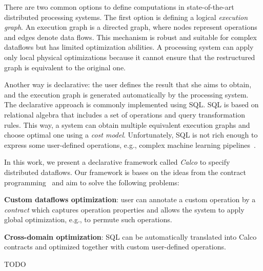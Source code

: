 There are two common options to define computations in state-of-the-art distributed processing systems.
The first option is defining a logical {\em execution graph}.
An execution graph is a directed graph, where nodes represent operations and edges denote data flows.
This mechanism is robust and suitable for complex dataflows but has limited optimization abilities.
A processing system can apply only local physical optimizations because it cannot ensure that the restructured graph is equivalent to the original one.

Another way is declarative: the user defines the result that she aims to obtain, and the execution graph is generated automatically by the processing system.
The declarative approach is commonly implemented using SQL.
SQL is based on relational algebra that includes a set of operations and query transformation rules.
This way, a system can obtain multiple equivalent execution graphs and choose optimal one using a {\em cost model}.
Unfortunately, SQL is not rich enough to express some user-defined operations, e.g., complex machine learning pipelines~\cite{PROOF}.

In this work, we present a declarative framework called {\em Calco} to specify distributed dataflows.
Our framework is bases on the ideas from the contract programming~\cite{REF} and aim to solve the following problems:

{\bf Custom dataflows optimization}: user can annotate a custom operation by a {\em contract} which captures operation properties and allows the system to apply global optimization, e.g., to permute such operations.

{\bf Cross-domain optimization}: SQL can be automatically translated into Calco contracts and optimized together with custom user-defined operations.

TODO
